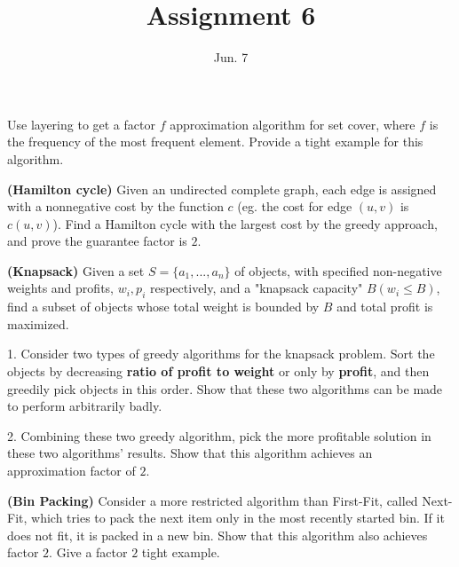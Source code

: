 \documentclass{article}
\title{{\bf Assignment 6} }
\author{}
\date{Jun. 7}
\newcounter{exercise}
\newcommand{\<}{
    \langle}
\renewcommand{\>}{
    \rangle}
\begin{document}
\maketitle


{\large

\begin{exercise}
Use layering to get a factor $f$ approximation algorithm for set cover,
where $f$ is the frequency of the most frequent element. Provide a tight example
for this algorithm.

\end{exercise}




\begin{exercise}
	\textbf{(Hamilton cycle)} Given an undirected complete graph, each edge is assigned with a nonnegative cost by the function $c$ (eg. the cost for edge $(u,v)$ is $c(u,v)$). Find a Hamilton cycle with the largest cost by the greedy approach, and prove the guarantee factor is $2$.
\end{exercise}



\begin{exercise}
	\textbf{(Knapsack)} Given a set $S = \{a_1, ... , a_n\}$ of objects, with specified non-negative weights and profits, $w_i,p_i$ respectively, and a "knapsack capacity" $B (w_i \le B)$, find a subset of objects whose total weight is bounded by $B$ and total profit is maximized.
	
	1. Consider two types of greedy algorithms for the knapsack problem. Sort the objects by decreasing \textbf{ratio of profit to weight} or only by \textbf{profit}, and then greedily pick objects in this order. Show that these two algorithms can be made to perform arbitrarily badly.
	
	2. Combining these two greedy algorithm, pick the more profitable solution in these two algorithms' results. Show that this algorithm achieves an approximation factor of $2$.
\end{exercise}

\begin{exercise}
	\textbf{(Bin Packing)} Consider a more restricted algorithm than First-Fit, called Next-Fit, which tries to pack the next item only in the most recently started bin. If it does not fit, it is packed in a new bin. Show that this algorithm also achieves factor $2$. Give a factor $2$ tight example.
\end{exercise}


}
\end{document}
